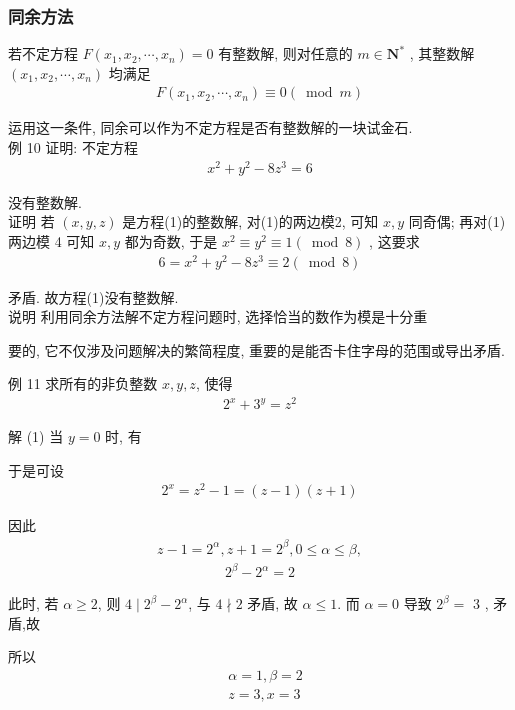 \subsubsection{同余方法}
若不定方程 $F\left(x_{1}, x_{2}, \cdots, x_{n}\right)=0$ 有整数解, 则对任意的 $m \in \mathbf{N}^{*}$ , 其整数解 $\left(x_{1}, x_{2}, \cdots, x_{n}\right)$ 均满足
\begin{align*}
	F\left(x_{1}, x_{2}, \cdots, x_{n}\right) \equiv 0(\bmod m)
\end{align*}

运用这一条件, 同余可以作为不定方程是否有整数解的一块试金石. \\
例 10 证明: 不定方程
\begin{align*}
	x^{2}+y^{2}-8 z^{3}=6
\end{align*}

没有整数解.\\
证明 若 $(x, y, z)$ 是方程(1)的整数解, 对(1)的两边模2, 可知 $x ,  y$ 同奇偶; 再对(1)两边模 4 可知 $x ,  y$ 都为奇数, 于是 $x^{2} \equiv y^{2} \equiv 1(\bmod 8)$ , 这要求
\begin{align*}
	6=x^{2}+y^{2}-8 z^{3} \equiv 2(\bmod 8)
\end{align*}

矛盾. 故方程(1)没有整数解.\\
说明 利用同余方法解不定方程问题时, 选择恰当的数作为模是十分重

要的, 它不仅涉及问题解决的繁简程度, 重要的是能否卡住字母的范围或导出矛盾.

例 11 求所有的非负整数 $x ,  y ,  z$, 使得
\begin{align*}
	2^{x}+3^{y}=z^{2}
\end{align*}

解 (1) 当 $y=0$ 时, 有

于是可设
\begin{align*}
	2^{x}=z^{2}-1=(z-1)(z+1)
\end{align*}

因此
\begin{align*}
	z-1=2^{\alpha}, z+1=2^{\beta}, 0 \leqslant \alpha \leqslant \beta,
\end{align*}
\begin{align*}
	2^{\beta}-2^{\alpha}=2
\end{align*}

此时, 若 $\alpha \geqslant 2$, 则 $4 \mid 2^{\beta}-2^{\alpha}$, 与 $4 \nmid 2$ 矛盾, 故 $\alpha \leqslant 1$. 而 $\alpha=0$ 导致 $2^{\beta}=$ 3 , 矛盾,故

所以\begin{align}
	 & \alpha=1, \beta=2 \\
	 & z=3, x=3
\end{align}

